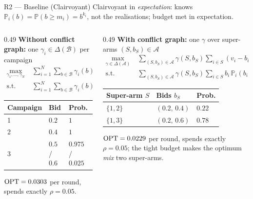 \documentclass[12pt,aspectratio=169]{beamer}
\begin{document}
\begin{frame}{R2 --- Baseline (Clairvoyant)}
\scriptsize
Clairvoyant in \emph{expectation}: knows $\mathbb P_i(b)=\mathbb P(b\ge m_i)=b^{k_i}$, not the realisations; budget met in expectation.
\vspace{-0.15cm}
\begin{columns}[T]
  \begin{column}{0.49\textwidth}
    \textbf{Without conflict graph:} one $\gamma_i\in\Delta(\mathcal B)$ per campaign
    \vspace{-0.35cm}
    \begin{align*}
      \max_{\gamma_1,\dots,\gamma_N}\;&\sum_{i=1}^{N}\sum_{b\in\mathcal B}\gamma_i(b)\,(v_i-b)\,\mathbb P_i(b)\\[-0.1cm]
      \text{s.t.}\;&\sum_{i=1}^{N}\sum_{b\in\mathcal B}\gamma_i(b)\,b\,\mathbb P_i(b)\le\rho,
      \quad \sum_{b}\gamma_i(b)=1\;\;\forall i
    \end{align*}
    \vspace{-0.45cm}
    \begin{center}
    \begin{tabular}{@{}lll@{}}
      \toprule
      Campaign & Bid & Prob.\\
      \midrule
      1 & $0.2$ & $1$\\
      2 & $0.4$ & $1$\\
      3 & $0.5$ / $0.6$ & $0.975$ / $0.025$\\
      \bottomrule
    \end{tabular}
    \end{center}
    \vspace{-0.2cm}
    $\mathrm{OPT}=0.0303$ per round, spends exactly $\rho=0.05$.
  \end{column}
  \begin{column}{0.49\textwidth}
    \textbf{With conflict graph:} one $\gamma$ over super-arms $(S,b_S)\in\mathcal A$
    \vspace{-0.35cm}
    \begin{align*}
      \max_{\gamma\in\Delta(\mathcal A)}\;&\sum_{(S,b_S)\in\mathcal A}\gamma(S,b_S)\sum_{i\in S}(v_i-b_i)\,\mathbb P_i(b_i)\\[-0.1cm]
      \text{s.t.}\;&\sum_{(S,b_S)\in\mathcal A}\gamma(S,b_S)\sum_{i\in S} b_i\,\mathbb P_i(b_i)\le\rho
    \end{align*}
    \vspace{-0.45cm}
    \begin{center}
    \begin{tabular}{@{}lll@{}}
      \toprule
      Super-arm $S$ & Bids $b_S$ & Prob.\\
      \midrule
      $\{1,2\}$ & $(0.2,\,0.4)$ & $0.22$\\
      $\{1,3\}$ & $(0.2,\,0.6)$ & $0.78$\\
      \bottomrule
    \end{tabular}
    \end{center}
    \vspace{-0.2cm}
    $\mathrm{OPT}=0.0229$ per round, spends exactly $\rho=0.05$;
    the tight budget makes the optimum \emph{mix} two super-arms.
  \end{column}
\end{columns}
\end{frame}
\end{document}
